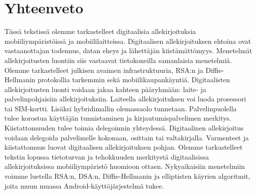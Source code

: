 \documentclass[finnish]{tktltiki2}
\theoremstyle{definition}
\theoremstyle{remark}
\begin{document}
\section{Yhteenveto}  

Tässä tekstissä olemme tarkastelleet digitaalisia allekirjoituksia mobiiliympäristöissä ja mobiililaitteissa. Digitaalisen allekirjoituksen ehtoina ovat vastaanottajan todennus, datan eheys ja lähettäjän kiistämättömyys. Menetelmät allekirjoitusten luontiin siis vastaavat tietokoneilla samanlaisia menetelmiä. Olemme tarkastelleet julkisen avaimen infrastruktuuria, RSA:n ja Diffie-Hellmanin protokollia tarkemmin sekä mobiilikaupankäyntiä. Digitaalisten allekirjoitusten luonti voidaan jakaa kahteen pääryhmään: laite- ja palvelinpohjaisiin allekirjoituksiin. Laiteella allekirjoituksen voi luoda prosessori tai SIM-kortti. Lisäksi hybridimallin olemassaolo tunnetaan. Palvelinpuolella tulee korostua käyttäjän tunnistaminen ja kirjautumispalvelimen merkitys. Kiistattomuuden tulee toimia delegoinnin yhteydessä. Digitaalinen allekirjoitus voidaan delegoida palvelimelle kokonaan, osittain tai valtakirjalla. Varmenteet ja kiistattomuus luovat digitaalisen allekirjoituksen pohjan. Olemme tarkastelleet tekstin lopussa tietoturvan ja tehokkuuden merkitystä digitaalisissa allekirjoituksissa mobiiliympäristö huomioon ottaen. Nykyaikaisiin menetelmiin voimme luetella RSA:n, DSA:n, Diffie-Hellmanin ja elliptisten käyrien algoritmit, joita muun muassa Android-käyttöjärjestelmä tukee.


%
%
%

\newpage






 
\end{document}

